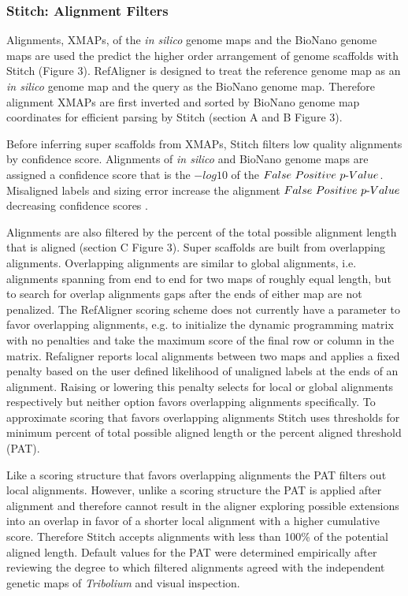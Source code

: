 \documentclass{bmcart}
\begin{document}
\subsubsection*{Stitch: Alignment Filters}

Alignments, XMAPs, of the \textit{in silico} genome maps and the BioNano genome maps are used the predict the higher order arrangement of genome scaffolds with Stitch (Figure 3). RefAligner is designed to treat the reference genome map as an \textit{in silico} genome map and the query as the BioNano genome map. Therefore alignment XMAPs are first inverted and sorted by BioNano genome map coordinates for efficient parsing by Stitch (section A and B Figure 3). 

Before inferring super scaffolds from XMAPs, Stitch filters low quality alignments by confidence score. Alignments of \textit{in silico} and BioNano genome maps are assigned a confidence score that is the $-log10$ of the $False\textnormal{ }Positive\textnormal{ }p\textnormal{-}Value$. Misaligned labels and sizing error increase the alignment $False\textnormal{ }Positive\textnormal{ }p\textnormal{-}Value$ decreasing confidence scores \cite{ProbFP} .

Alignments are also filtered by the percent of the total possible alignment length that is aligned (section C Figure 3). Super scaffolds are built from overlapping alignments. Overlapping alignments are similar to global alignments, i.e. alignments spanning from end to end for two maps of roughly equal length, but to search for overlap alignments gaps after the ends of either map are not penalized. The RefAligner scoring scheme does not currently have a parameter to favor overlapping alignments, e.g. to initialize the dynamic programming matrix with no penalties and take the maximum score of the final row or column in the matrix. Refaligner reports local alignments between two maps and applies a fixed penalty based on the user defined likelihood of unaligned labels at the ends of an alignment. Raising or lowering this penalty selects for local or global alignments respectively but neither option favors overlapping alignments specifically. To approximate scoring that favors overlapping alignments Stitch uses thresholds for minimum percent of total possible aligned length or the percent aligned threshold (PAT). 

Like a scoring structure that favors overlapping alignments the PAT filters out local alignments. However, unlike a scoring structure the PAT is applied after alignment and therefore cannot result in the aligner exploring possible extensions into an overlap in favor of a shorter local alignment with a higher cumulative score. Therefore Stitch accepts alignments with less than 100\% of the potential aligned length. Default values for the PAT were determined empirically after reviewing the degree to which filtered alignments agreed with the independent genetic maps of \textit{Tribolium} and visual inspection.
\end{document}
